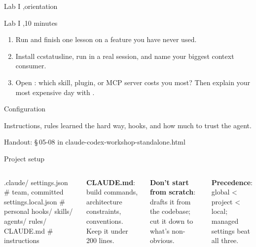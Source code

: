 \documentclass[aspectratio=169,11pt,t]{beamer}
\newcommand{\partframe}[4]{%
  \setsec{}%
  \begin{frame}[c]
    \lbl{Part #1}\par\vspace{0.5em}
    {\seriffamily\fontsize{40}{42}\selectfont #2}\par\vspace{0.8em}
    \begin{minipage}{0.8\textwidth}\raggedright\color{muted}#4\end{minipage}\par\vspace{1.4em}
    {\ttfamily\scriptsize\color{dim}Handout: \S\,#3 in claude-codex-workshop-standalone.html}
  \end{frame}}
\begin{document}
\setsec{}
\begin{frame}{Lab I \sep orientation}
  \begin{lab}{Lab I \sep 10 minutes}
    \begin{enumerate}\setlength\itemsep{0.5em}
      \item Run  and finish one lesson on a feature you have never used.
      \item Install ccstatusline, run  in a real session, and name your biggest context consumer.
      \item Open : which skill, plugin, or MCP server costs you most? Then explain your most expensive day with .
    \end{enumerate}
  \end{lab}
\end{frame}

\partframe{II}{Configuration}{05-08}{Instructions, rules learned the hard way, hooks, and how much to trust the agent.}

\begin{frame}[fragile]{Project setup}
  \begin{columns}[T,onlytextwidth]
\begin{code}[basicstyle=\ttfamily\scriptsize\color{codefg}]
.claude/
  settings.json        # team, committed
  settings.local.json  # personal
  hooks/ skills/ agents/ rules/
CLAUDE.md              # instructions
\end{code}
      \small
      \textbf{CLAUDE.md}: build commands, architecture constraints, conventions. Keep it under 200 lines.\par\vspace{0.45em}
      \textbf{Don't start from scratch}:  drafts it from the codebase; cut it down to what's non-obvious.\par\vspace{0.45em}
      \textbf{Precedence}: global < project < local; managed settings beat all three.
  \end{columns}
\end{frame}
\end{document}

